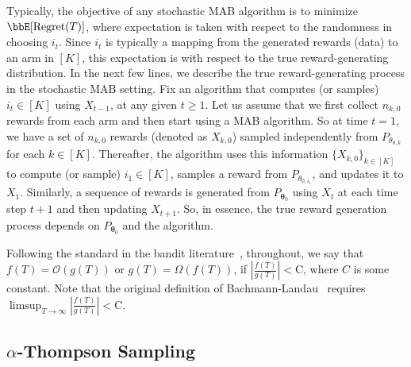 \documentclass[11pt]{article}
\begin{document}
Typically, the objective of any stochastic MAB algorithm is to 
minimize $\bbE[\text{Regret}(T)]$, where expectation is taken with respect to the randomness in choosing $i_t$. Since $i_t$ is typically a mapping from the generated rewards (data) to an arm in $[K]$, this expectation is with respect to the true reward-generating distribution. 
In the next few lines, we describe the true reward-generating process in the stochastic MAB setting. 
Fix an algorithm that computes (or samples) $i_t \in [K]$ using $X_{t-1}$,  at any given $t\geq 1$. Let us assume that we first collect $n_{k,0}$ rewards from each arm and then start using  a MAB algorithm. 
So at time $t=1$, we have a set of $n_{k,0}$ rewards (denoted as $X_{k,0}$) sampled independently from $P_{\theta_{0,k}}$ for each $k\in [K]$. 
Thereafter, the algorithm uses this information $\{X_{k,0}\}_{k\in[K]}$ to compute (or sample) $i_1\in [K]$, samples a reward from $P_{\theta_{0,i_1}}$, and updates it to $X_1$. Similarly, a sequence of rewards is generated from $P_{\pmb \theta_0}$ using $X_t$ at each time step $t+1$ and then updating $X_{t+1}$. So, in essence, the true reward generation process depends on $P_{\pmb \theta_0}$ and the algorithm.

Following the standard in the bandit literature~\citep{lattimoreandszepesvari_2020}, throughout, we say that $f(T)=\mathcal{O}(g(T))$ or $g(T)=\Omega(f(T))$, if $ \left |\frac{f(T)}{g(T)}\right | < \text{C}$, where $C$ is some constant. Note that the original definition of Bachmann-Landau~\citep{bachmann1923analytische,landau1909handbuch} requires $ \limsup_{T\to\infty} \left |\frac{f(T)}{g(T)}\right | < \text{C}$. %

\subsection{$\alpha$-Thompson Sampling}~\label{sec:AlphaTS}
\end{document}
